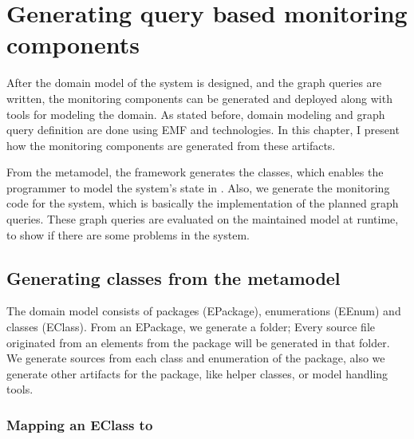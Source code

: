 \chapter{Generating query based monitoring components}

After the domain model of the system is designed, and the graph queries are written, the monitoring components can be generated and deployed along with \cpp{} tools for modeling the domain.
As stated before, domain modeling and graph query definition are done using EMF and \viatra{} technologies.
In this chapter, I present how the monitoring components are generated from these artifacts.

From the metamodel, the framework generates the classes, which enables the programmer to model the system's state in \cpp{}.
Also, we generate the monitoring code for the system, which is basically the \cpp{} implementation of the planned graph queries. 
These graph queries are evaluated on the maintained \cpp{} model at runtime, to show if there are some problems in the system.

		\section{Generating classes from the metamodel}

The domain model consists of packages (EPackage), enumerations (EEnum) and classes (EClass).
From an EPackage, we generate a folder; Every source file originated from an elements from the package will be generated in that folder. 
We generate sources from each class and enumeration of the package, also we generate other artifacts for the package, like helper classes, or model handling tools.


\subsection{Mapping an EClass to \protect\cpp }


